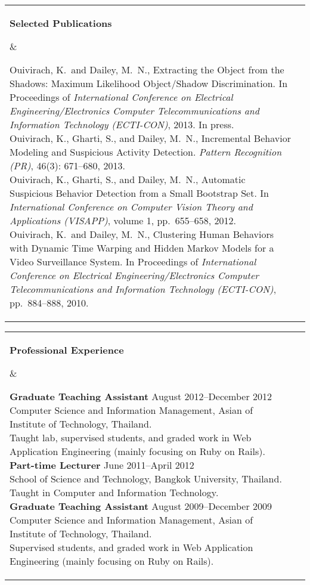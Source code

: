 \documentclass[11pt]{article}
\makeatletter
\newcommand{\mysection}[2]{
   \noindent
   \begin{tabular}{@{}ll@{}}
   \parbox[t]{1.0in}{ \raggedright \bf #1 } &
   \parbox[t]{5.0in}{ #2 }\\
   \hspace{0.2in}
   \end{tabular}
}
\makeatother
\begin{document}
\mysection{Selected Publications}{ 
Ouivirach, K.\ and Dailey, M.\ N., Extracting the Object from the
Shadows: Maximum Likelihood Object/Shadow Discrimination. In
Proceedings of \textit{International Conference on Electrical
Engineering/Electronics Computer Telecommunications and Information
Technology (ECTI-CON)}, 2013. In press.\\

Ouivirach, K., Gharti, S., and Dailey, M.\ N., Incremental Behavior
Modeling and Suspicious Activity Detection. \textit{Pattern
Recognition (PR)}, 46(3): 671--680, 2013.\\

Ouivirach, K., Gharti, S., and Dailey, M.\ N., Automatic Suspicious
Behavior Detection from a Small Bootstrap Set. In
\textit{International Conference on Computer Vision Theory and 
Applications (VISAPP)}, volume 1, pp.\ 655--658, 2012.\\

Ouivirach, K.\ and Dailey, M.\ N., Clustering Human Behaviors with 
Dynamic Time Warping and Hidden Markov Models for a Video Surveillance 
System. In Proceedings of \textit{International Conference on 
Electrical Engineering/Electronics Computer Telecommunications and 
Information Technology (ECTI-CON)}, pp.\ 884--888, 2010.} 

\vspace{0.1in}

\mysection{Professional Experience}{ 
{\bf Graduate Teaching Assistant} \hfill August 2012--December 2012\\
Computer Science and Information Management, Asian of Institute
of Technology, Thailand.\\ 
Taught lab, supervised students, and graded work in Web Application 
Engineering (mainly focusing on Ruby on Rails).\\

{\bf Part-time Lecturer} \hfill June 2011--April 2012\\ 
School of Science and Technology, Bangkok University, Thailand.\\
Taught in Computer and Information Technology.\\

{\bf Graduate Teaching Assistant} \hfill August 2009--December 2009\\
Computer Science and Information Management, Asian of Institute
of Technology, Thailand.\\ 
Supervised students, and graded work in Web Application Engineering (mainly 
focusing on Ruby on Rails).}
\end{document}
